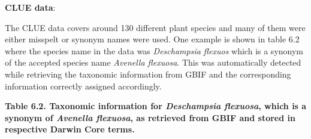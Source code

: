 \documentclass[
  oneside]{book}
\begin{document}
\begin{examplebox}

\textbf{CLUE data}:

The CLUE data covers around 130 different plant species and many of them were either misspelt or synonym names were used. One example is shown in table 6.2 where the species name in the data was \emph{Deschampsia flexuos} which is a synonym of the accepted species name \emph{Avenella flexuosa}. This was automatically detected while retrieving the taxonomic information from GBIF and the corresponding information correctly assigned accordingly.

{\textbf{Table 6.2. Taxonomic information for \emph{Deschampsia flexuosa}, which is a synonym of \emph{Avenella flexuosa}, as retrieved from GBIF and stored in respective Darwin Core terms.}}


\end{examplebox}
\end{document}
